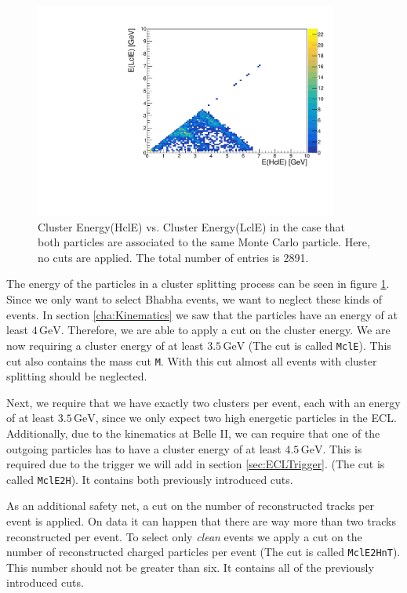 \documentclass[a4paper,11pt,twosided,final,german,openbib,pdftex,listof=totoc,bibliography=totoc]{scrbook}
\begin{document}
\begin{figure}[h!]
	\centering
	\includegraphics[width=10cm]{AnhangPlots/EEdoubleMCE}
	\caption[Cluster Splitting Energy Distribution]{Cluster Energy(HclE) vs. Cluster Energy(LclE) in the case that both particles are associated to the same Monte Carlo particle. Here, no cuts are applied. The total number of entries is 2891.}
	\label{fig:clusterSplittingE}
\end{figure}


The energy of the particles in a cluster splitting process can be seen in figure \ref{fig:clusterSplittingE}. Since we only want to select Bhabha events, we want to neglect these kinds of events. In section \ref{cha:Kinematics} we saw that the particles have an energy of at least $4\,\textrm{GeV}$. Therefore, we are able to apply a cut on the cluster energy. We are now requiring a cluster energy of at least $3.5\,\textrm{GeV}$ (The cut is called \texttt{MclE}). This cut also contains the mass cut \texttt{M}. With this cut almost all events with cluster splitting should be neglected.

Next, we require that we have exactly two clusters per event, each with an energy of at least $3.5\,\textrm{GeV}$, since we only expect two high energetic particles in the ECL. Additionally, due to the kinematics at Belle II, we can require that one of the outgoing particles has to have a cluster energy of at least $4.5\,\textrm{GeV}$. This is required due to the trigger we will add in section \ref{sec:ECLTrigger}. (The cut is called \texttt{MclE2H}). It contains both previously introduced cuts.

As an additional safety net, a cut on the number of reconstructed tracks per event is applied. On data it can happen that there are way more than two tracks reconstructed per event. To select only \textit{clean} events we apply a cut on the number of reconstructed charged particles per event (The cut is called \texttt{MclE2HnT}). This number should not be greater than six. It contains all of the previously introduced cuts.
\end{document}
